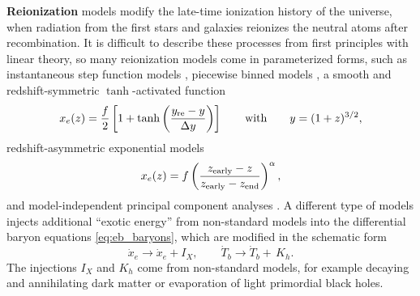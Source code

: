 \documentclass[USenglish, thumbmarks]{uiophdthesis} %
\newcommand\LCDM{\ensuremath{\mathrm{\Lambda CDM}}}
\begin{document}

\textbf{Reionization} models modify the late-time ionization history of the universe,
when radiation from the first stars and galaxies reionizes the neutral atoms after recombination.
It is difficult to describe these processes from first principles with linear theory,
so many reionization models come in parameterized forms, such as
instantaneous step function models \cite{seljakLineSightApproach1996,bruscoliHowReionizationEpoch2002},
piecewise binned models \cite{lewisCosmicMicrowaveBackground2006},
a smooth and redshift-symmetric $\tanh$-activated function \cite{lewisCosmologicalParametersWMAP2008a}
\begin{equation}
x_e(z) = \frac{f}{2}\left[1 + \tanh \left(\frac{y_{\rm re} - y}{\Delta y}\right)\right] \qquad\text{with}\qquad y = (1+z)^{3/2} ,
\end{equation}
redshift-asymmetric exponential models \cite{douspisNewParameterizationReionisation2015,collaborationPlanckIntermediateResults2016}
\begin{equation}
x_e(z) = f \left(\frac{z_{\rm early} - z}{z_{\rm early} - z_{\rm end}}\right)^{\alpha} ,
\end{equation}
and model-independent principal component analyses \cite{huModelIndependentReionizationObservables2003,mortonsonReionizationConstraintsFiveyear2008,heinrichCompleteReionizationConstraints2017a}.
A different type of models injects additional \enquote{exotic energy} from non-standard models into the differential baryon equations \eqref{eq:eb_baryons},
which are modified in the schematic form
\cite{poulinDarkMatterAnnihilations2015,stockerExoticEnergyInjection2018}
\begin{equation}
\dot{x}_e \rightarrow \dot{x}_e + I_X,
\qquad
\dot{T}_b \rightarrow \dot{T}_b + \,K_h .
\end{equation}
The injections $I_X$ and $K_h$ come from non-standard models,
for example decaying and annihilating dark matter or evaporation of light primordial black holes.
\end{document}
